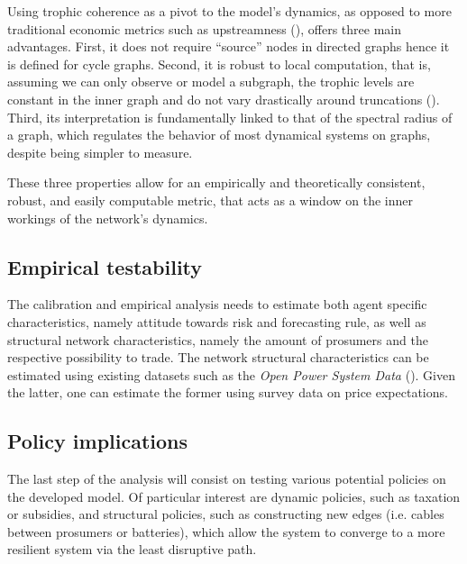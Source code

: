 \documentclass[american]{scrartcl}
\begin{document}
Using trophic coherence as a pivot to the model's dynamics, as opposed to more traditional economic metrics such as upstreamness (\cite{Antrs2012}), offers three main advantages. First, it does not require ``source'' nodes in directed graphs hence it is defined for cycle graphs. Second, it is robust to local computation, that is, assuming we can only observe or model a subgraph, the trophic levels are constant in the inner graph and do not vary drastically around truncations (\cite[p.~19]{MacKay2020}). Third, its interpretation is fundamentally linked to that of the spectral radius of a graph, which regulates the behavior of most dynamical systems on graphs, despite being simpler to measure. %

These three properties allow for an empirically and theoretically consistent, robust, and easily computable metric, that acts as a window on the inner workings of the network's dynamics. %


\subsection{Empirical testability}

The calibration and empirical analysis needs to estimate both agent specific characteristics, namely attitude towards risk and forecasting rule, as well as structural network characteristics, namely the amount of prosumers and the respective possibility to trade. The network structural characteristics can be estimated using existing datasets such as the \textit{Open Power System Data} (\cite{Wiese2019}). Given the latter, one can estimate the former using survey data on price expectations.

\subsection{Policy implications}

The last step of the analysis will consist on testing various potential policies on the developed model. Of particular interest are dynamic policies, such as taxation or subsidies, and structural policies, such as constructing new edges (i.e. cables between prosumers or batteries), which allow the system to converge to a more resilient system via the least disruptive path.

\newpage
{} %

\printbibliography
\end{document}
